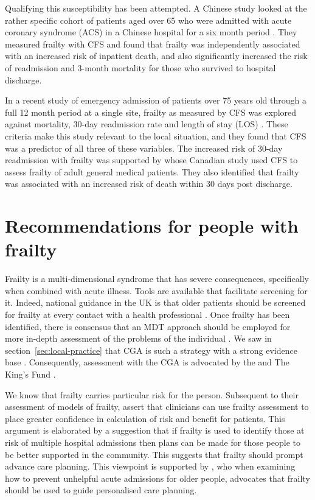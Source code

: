 \documentclass
[
	12pt,
	a4paper,
	oneside,
]{report}
\begin{document}
Qualifying this susceptibility
has been attempted. 
A Chinese study looked at the rather specific cohort of patients aged over 65
who were admitted with acute coronary syndrome (ACS) in a Chinese hospital for 
a six month period \parencite{kang:15}. They measured frailty with CFS and 
found that frailty was independently associated with an increased risk of 
inpatient death, and also significantly increased the risk of readmission and 
3-month mortality for those who survived to hospital discharge.

In a recent study of emergency admission of patients over 
75 years old through a full 12 month period at a single site, frailty as
measured by CFS was explored against mortality, 30-day readmission rate and 
length of stay (LOS)
\parencite{wallis:15}.
These criteria make this study relevant to the local situation, and they found 
that CFS was a predictor of all three of these variables. The increased risk of
30-day readmission with frailty was supported by \textcite{kahlon:15} whose 
Canadian study used CFS to assess frailty of adult general medical patients. 
They also identified that frailty was associated with an increased risk of death
within 30 days post discharge.

\section{Recommendations for people with frailty}

Frailty is a multi-dimensional syndrome that has severe consequences,
specifically when combined with acute illness. Tools are available that facilitate
screening for it. Indeed, national guidance in the UK is that older patients 
should be screened for frailty at every contact with a health professional 
\parencite{bgs:14}. Once frailty has been identified, there is consensus that
an MDT approach should be employed for more in-depth assessment of the 
problems of the individual \parencite{vellas:16}. We saw in 
section~\ref{sec:local-practice} that CGA
is such a strategy with a strong evidence base \parencite{ellis:11}.
Consequently, assessment with the CGA is advocated by the \textcite{bgs:14}
and The King's Fund \parencite{oliver:14}.

We know that frailty carries particular risk for the person. Subsequent to their
assessment of models of frailty, 
\textcite{martin:08} assert that clinicians can use frailty assessment to place 
greater confidence
in calculation of risk and benefit for patients. This argument is elaborated by 
a suggestion that if frailty is used to identify those at risk of multiple 
hospital admissions then plans can be made for those people to be better
supported in the community. This suggests that frailty should prompt advance care
planning. This viewpoint is supported by 
\textcite{hunt:16}, who when examining how to prevent unhelpful acute admissions
for older people, advocates that frailty should be used to guide personalised 
care planning.
\end{document}
